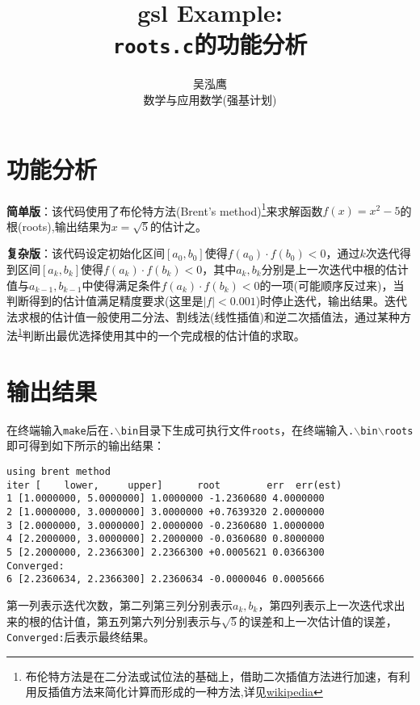 \documentclass[a4paper]{ctexart}
\author{吴泓鹰\\数学与应用数学(强基计划)\quad3210101890}
\title{\textbf{gsl Example:}\\ \texttt{roots.c}的功能分析}
\begin{document}
\maketitle

\section{功能分析}
\textbf{简单版}：该代码使用了布伦特方法(Brent's method)\footnote{布伦特方法是在二分法或试位法的基础上，借助二次插值方法进行加速，有利用反插值方法来简化计算而形成的一种方法,详见\href{https://en.wikipedia.org/wiki/Brent's_method}{wikipedia}\label{web}}来求解函数$f(x)=x^2-5$的根(roots),输出结果为$x=\sqrt5$的估计之。

\textbf{复杂版}：该代码设定初始化区间$[a_0,b_0]$使得$f(a_0)\cdot f(b_0)<0$，通过$k$次迭代得到区间$[a_k,b_k]$使得$f(a_k)\cdot f(b_k)<0$，其中$a_k,b_k$分别是上一次迭代中根的估计值与$a_{k-1},b_{k-1}$中使得满足条件$f(a_k)\cdot f(b_k)<0$的一项(可能顺序反过来)，当判断得到的估计值满足精度要求(这里是$|f|<0.001$)时停止迭代，输出结果。迭代法求根的估计值一般使用二分法、割线法(线性插值)和逆二次插值法，通过某种方法\textsuperscript{\ref {web}}判断出最优选择使用其中的一个完成根的估计值的求取。


\section{输出结果}
在终端输入\texttt{make}后在\texttt{.$\backslash$bin}目录下生成可执行文件\texttt{roots}，在终端输入\texttt{.$\backslash$bin$\backslash$roots}即可得到如下所示的输出结果：
\begin{verbatim}
using brent method
iter [    lower,     upper]      root        err  err(est)
1 [1.0000000, 5.0000000] 1.0000000 -1.2360680 4.0000000
2 [1.0000000, 3.0000000] 3.0000000 +0.7639320 2.0000000
3 [2.0000000, 3.0000000] 2.0000000 -0.2360680 1.0000000
4 [2.2000000, 3.0000000] 2.2000000 -0.0360680 0.8000000
5 [2.2000000, 2.2366300] 2.2366300 +0.0005621 0.0366300
Converged:
6 [2.2360634, 2.2366300] 2.2360634 -0.0000046 0.0005666
\end{verbatim}

第一列表示迭代次数，第二列第三列分别表示$a_k,b_k$，第四列表示上一次迭代求出来的根的估计值，第五列第六列分别表示与$\sqrt5$的误差和上一次估计值的误差，\verb|Converged:|后表示最终结果。
\end{document}
